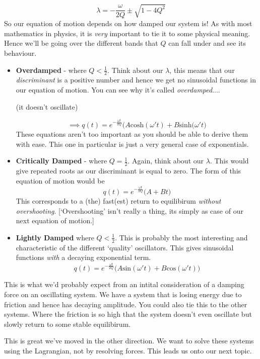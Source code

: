 \begin{equation}
\lambda = -\frac{\omega}{2Q} \pm \sqrt{1-4Q^{2}}
\end{equation}
So our equation of motion depends on how damped our system is! As with most mathematics in physics, it is \textit{very} important to tie it to some physical meaning. Hence we'll be going over the different bands that $Q$ can fall under and see its behaviour.
\begin{itemize}
\item \textbf{Overdamped} - where $Q < \frac{1}{2}$. Think about our $\lambda$, this means that our \textit{discriminant} is a positive number and hence we get no sinusoidal functions in our equation of motion. You can see why it's called \textit{overdamped}.... \begin{tiny}(it doesn't oscillate) 
\end{tiny}
\begin{equation}
\implies q(t) = e^{-\frac{\omega t}{2Q}}\Big(A\textrm{cosh}(\omega't) + B\textrm{sinh}(\omega't\Big)
\end{equation}
These equations aren't too important as you should be able to derive them with ease. This one in particular is just a very general case of exponentials. 
\item \textbf{Critically Damped} - where $Q = \frac{1}{2}$. Again, think about our $\lambda$. This would give repeated roots as our discriminant is equal to zero. The form of this equation of motion would be 
\begin{equation}
q(t) = e^{-\frac{\omega t}{2Q}}\Big(A+Bt\Big)
\end{equation}
This corresponds to a (the) fast(est) return to equilibirum \textit{without overshooting}. [`Overshooting' isn't really a thing, its simply as case of our next equation of motion.] 
\item \textbf{Lightly Damped} where $Q < \frac{1}{2}$. This is probably the most interesting and characteristic of the different `quality' oscillators. This gives sinusoidal functions \textit{with} a decaying exponential term.
\begin{equation}
q(t) = e^{-\frac{\omega t}{2Q}}\Big(A\textrm{sin}(\omega' t) + B\textrm{cos}(\omega 't)\Big)
\end{equation}
\end{itemize}
This is what we'd probably expect from an intital consideration of a damping force on an oscillating system. We have a system that is losing energy due to friction and hence has decaying amplitude. You could also tie this to the other systems. Where the friction is so high that the system doesn't even oscillate but slowly return to some stable equilibirum. \par This is great  we've moved in the other direction. We want to solve these systems using the Lagrangian, not by resolving forces. This leads us onto our next topic.
